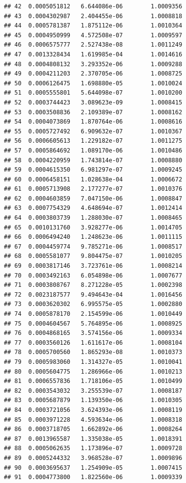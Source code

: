 \documentclass{article}\usepackage[]{graphicx}\usepackage[]{xcolor}
\makeatletter
\newenvironment{kframe}{%
 \def\at@end@of@kframe{}%
 \ifinner\ifhmode%
  \def\at@end@of@kframe{\end{minipage}}%
  \begin{minipage}{\columnwidth}%
 \fi\fi%
 \def\FrameCommand##1{\hskip\@totalleftmargin \hskip-\fboxsep
 \colorbox{shadecolor}{##1}\hskip-\fboxsep
     \hskip-\linewidth \hskip-\@totalleftmargin \hskip\columnwidth}%
 \MakeFramed {\advance\hsize-\width
   \@totalleftmargin\z@ \linewidth\hsize
   \@setminipage}}%
 {\par\unskip\endMakeFramed%
 \at@end@of@kframe}
\newenvironment{knitrout}{}{} %
\makeatother
\begin{document}
\begin{knitrout}
\begin{kframe}
\begin{verbatim}
## 42  0.0005051812   6.644086e-06        1.0009356
## 43  0.0004302987   2.404455e-06        1.0008818
## 44  0.0005781387   1.875112e-06        1.0010364
## 45  0.0004950999   4.572508e-07        1.0009597
## 46  0.0006575777   2.527438e-08        1.0011249
## 47  0.0013328434   1.619985e-04        1.0014616
## 48  0.0004808132   3.293352e-06        1.0009288
## 49  0.0004211203   2.370705e-06        1.0008725
## 50  0.0006126475   1.698880e-05        1.0010024
## 51  0.0005555801   5.644098e-07        1.0010200
## 52  0.0003744423   3.089623e-09        1.0008415
## 53  0.0003508836   2.109389e-07        1.0008162
## 54  0.0004073869   1.870764e-06        1.0008616
## 55  0.0005727492   6.909632e-07        1.0010367
## 56  0.0006605613   1.229182e-07        1.0011275
## 57  0.0005864692   1.089170e-06        1.0010486
## 58  0.0004220959   1.743814e-07        1.0008880
## 59  0.0004615350   6.981297e-07        1.0009245
## 60  0.0006458151   1.028638e-04        1.0006672
## 61  0.0005713908   2.177277e-07        1.0010376
## 62  0.0004603859   7.047150e-06        1.0008847
## 63  0.0007754329   4.648694e-07        1.0012414
## 64  0.0003803739   1.288030e-07        1.0008465
## 65  0.0010131760   3.928277e-06        1.0014705
## 66  0.0006494240   1.248623e-06        1.0011115
## 67  0.0004459774   9.785271e-06        1.0008517
## 68  0.0005581077   9.804475e-07        1.0010205
## 69  0.0003817146   3.723761e-06        1.0008214
## 70  0.0003492163   6.054898e-06        1.0007677
## 71  0.0003808767   8.271228e-05        1.0002398
## 72  0.0023187577   9.494643e-04        1.0016456
## 73  0.0003620302   6.995575e-05        1.0002880
## 74  0.0005878170   2.154599e-06        1.0010449
## 75  0.0004604567   5.764895e-06        1.0008925
## 76  0.0004868165   3.574156e-06        1.0009334
## 77  0.0003560126   1.611617e-06        1.0008104
## 78  0.0005700560   1.865293e-08        1.0010373
## 79  0.0005983060   1.314327e-05        1.0010041
## 80  0.0005604775   1.286966e-06        1.0010213
## 81  0.0006557836   1.718106e-05        1.0010499
## 82  0.0003543032   3.255539e-07        1.0008187
## 83  0.0005687879   1.139350e-06        1.0010305
## 84  0.0003721056   3.624393e-06        1.0008119
## 85  0.0003971228   4.593634e-06        1.0008318
## 86  0.0003718705   1.662892e-06        1.0008264
## 87  0.0013965587   1.335038e-05        1.0018391
## 88  0.0005062635   1.173896e-07        1.0009728
## 89  0.0005244332   3.968528e-07        1.0009896
## 90  0.0003695637   1.254909e-05        1.0007415
## 91  0.0004773800   1.822560e-06        1.0009339

\end{verbatim}
\end{kframe}
\end{knitrout}
\end{document}
